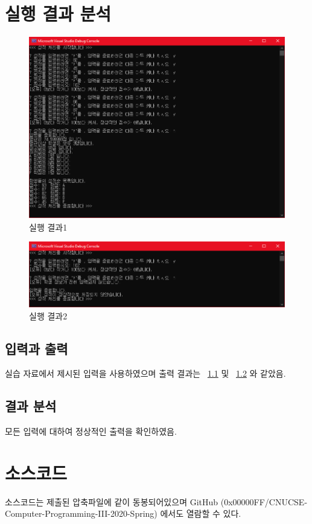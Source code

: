 \documentclass[UTF8]{report}
\begin{document}
    \chapter{실행 결과 분석}
        \begin{figure}[h]
            \centering
            \includegraphics[width=\textwidth]{result_1.png}
            \caption{실행 결과1}
            \label{fig:result}
        \end{figure}
        
        \begin{figure}[h]
            \centering
            \includegraphics[width=\textwidth]{result_2.png}
            \caption{실행 결과2}
            \label{fig:result2}
        \end{figure}
        
        
        \section{입력과 출력}
            실습 자료에서 제시된 입력을 사용하였으며 출력 결과는 ~\ref{fig:result} 및 ~\ref{fig:result2} 와 같았음.
        \section{결과 분석}
            모든 입력에 대하여 정상적인 출력을 확인하였음.

    \chapter{소스코드}
        소스코드는 제출된 압축파일에 같이 동봉되어있으며 GitHub (0x00000FF/CNUCSE-Computer-Programming-III-2020-Spring) 에서도 열람할 수 있다.
\end{document}
